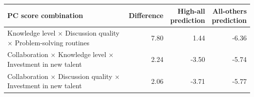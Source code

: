 \begin{table}[h]
\label{tab:pc_score_combo_k3_top3}
\begin{tabular}{p{5.5cm}rrr}
\toprule
PC score combination & Difference & \shortstack{High-all\\prediction} & \shortstack{All-others\\prediction} \\
\midrule
Knowledge level $\times$ Discussion quality $\times$ Problem-solving routines & 7.80 & 1.44 & -6.36 \\
Collaboration $\times$ Knowledge level $\times$ Investment in new talent & 2.24 & -3.50 & -5.74 \\
Collaboration $\times$ Discussion quality $\times$ Investment in new talent & 2.06 & -3.71 & -5.77 \\
\bottomrule
\end{tabular}
\end{table}
